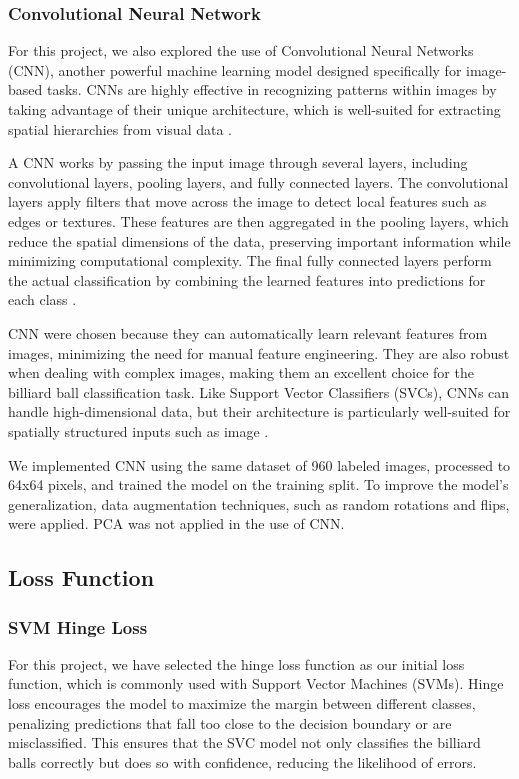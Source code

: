 \documentclass{article}
\begin{document}
\subsubsection*{Convolutional Neural Network}
\label{sec:convolutional_neural_network}
For this project, we also explored the use of Convolutional Neural Networks (CNN), another powerful machine learning model designed specifically for image-based tasks. CNNs are highly effective in recognizing patterns within images by taking advantage of their unique architecture, which is well-suited for extracting spatial hierarchies from visual data \cite{osheaIntroductionConvolutionalNeural2015}.

A CNN works by passing the input image through several layers, including convolutional layers, pooling layers, and fully connected layers. The convolutional layers apply filters that move across the image to detect local features such as edges or textures. These features are then aggregated in the pooling layers, which reduce the spatial dimensions of the data, preserving important information while minimizing computational complexity. The final fully connected layers perform the actual classification by combining the learned features into predictions for each class \cite{osheaIntroductionConvolutionalNeural2015}.

CNN were chosen because they can automatically learn relevant features from images, minimizing the need for manual feature engineering. They are also robust when dealing with complex images, making them an excellent choice for the billiard ball classification task. Like Support Vector Classifiers (SVCs), CNNs can handle high-dimensional data, but their architecture is particularly well-suited for spatially structured inputs such as image \cite{osheaIntroductionConvolutionalNeural2015}.

We implemented CNN using the same dataset of 960 labeled images, processed to 64x64 pixels, and trained the model on the training split. To improve the model's generalization, data augmentation techniques, such as random rotations and flips, were applied. PCA was not applied in the use of CNN.


\subsection{Loss Function} %
\label{sec:loss_function}
\subsubsection*{SVM Hinge Loss}
\label{sec:svm_hinge_loss}
For this project, we have selected the hinge loss function as our initial loss function, which is commonly used with Support Vector Machines (SVMs). Hinge loss encourages the model to maximize the margin between different classes, penalizing predictions that fall too close to the decision boundary or are misclassified. This ensures that the SVC model not only classifies the billiard balls correctly but does so with confidence, reducing the likelihood of errors. \cite{unknownMachineLearningApproach2023, bartlettClassificationRejectOption2008}
\end{document}
